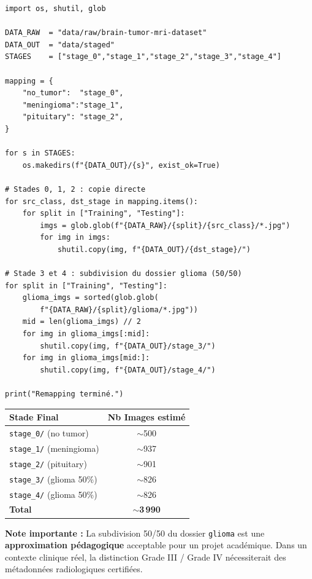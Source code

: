\documentclass[12pt,a4paper]{article}
\begin{document}
\begin{verbatim}
import os, shutil, glob

DATA_RAW  = "data/raw/brain-tumor-mri-dataset"
DATA_OUT  = "data/staged"
STAGES    = ["stage_0","stage_1","stage_2","stage_3","stage_4"]

mapping = {
    "no_tumor":  "stage_0",
    "meningioma":"stage_1",
    "pituitary": "stage_2",
}

for s in STAGES:
    os.makedirs(f"{DATA_OUT}/{s}", exist_ok=True)

# Stades 0, 1, 2 : copie directe
for src_class, dst_stage in mapping.items():
    for split in ["Training", "Testing"]:
        imgs = glob.glob(f"{DATA_RAW}/{split}/{src_class}/*.jpg")
        for img in imgs:
            shutil.copy(img, f"{DATA_OUT}/{dst_stage}/")

# Stade 3 et 4 : subdivision du dossier glioma (50/50)
for split in ["Training", "Testing"]:
    glioma_imgs = sorted(glob.glob(
        f"{DATA_RAW}/{split}/glioma/*.jpg"))
    mid = len(glioma_imgs) // 2
    for img in glioma_imgs[:mid]:
        shutil.copy(img, f"{DATA_OUT}/stage_3/")
    for img in glioma_imgs[mid:]:
        shutil.copy(img, f"{DATA_OUT}/stage_4/")

print("Remapping terminé.")
\end{verbatim}

\vspace{0.3cm}
\begin{center}
\begin{tabular}{|l|c|}
\hline
\rowcolor{accentGreen!20}
\textbf{Stade Final} & \textbf{Nb Images estimé} \\
\hline
\texttt{stage\_0/} (no tumor)   & $\sim$500  \\
\texttt{stage\_1/} (meningioma) & $\sim$937  \\
\texttt{stage\_2/} (pituitary)  & $\sim$901  \\
\texttt{stage\_3/} (glioma 50\%) & $\sim$826  \\
\texttt{stage\_4/} (glioma 50\%) & $\sim$826  \\
\hline
\textbf{Total}                  & \textbf{$\sim$3\,990} \\
\hline
\end{tabular}
\end{center}

\vspace{0.3cm}
\begin{alertbox}
\textbf{\faExclamationTriangle\quad Note importante :} La subdivision 50/50 du dossier \texttt{glioma} est une \textbf{approximation pédagogique} acceptable pour un projet académique. Dans un contexte clinique réel, la distinction Grade III / Grade IV nécessiterait des métadonnées radiologiques certifiées.
\end{alertbox}
\end{document}
